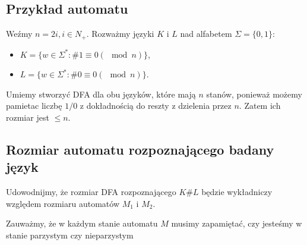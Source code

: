 \documentclass{article}
\theoremstyle{definition}
\theoremstyle{remark}
\begin{document}
\subsection{Przykład automatu}

Weźmy \(n = 2i, i \in N_+\).
Rozważmy języki \(K\) i \(L\) nad alfabetem \(\Sigma = \{0, 1\}\):
\begin{itemize}
    \item \(K = \{ w \in \Sigma^* : \# 1 \equiv 0 (\mod n) \}\),
    \item \(L = \{ w \in \Sigma^* : \# 0 \equiv 0 (\mod n) \}\).
\end{itemize}

Umiemy stworzyć DFA dla obu języków, które mają \(n\) stanów,
ponieważ możemy pamietac liczbę \(1/0\) z dokładnością do reszty z dzielenia przez \(n\).
Zatem ich rozmiar jest \(\leq n\).

\subsection{Rozmiar automatu rozpoznającego badany język}

Udowodnijmy, że rozmiar DFA rozpoznającego \(K \# L\) będzie wykładniczy względem rozmiaru automatów \(M_1\) i \(M_2\).

Zauważmy, że w każdym stanie automatu \(M\) musimy zapamiętać, czy jesteśmy w stanie parzystym czy nieparzystym 
\end{document}
